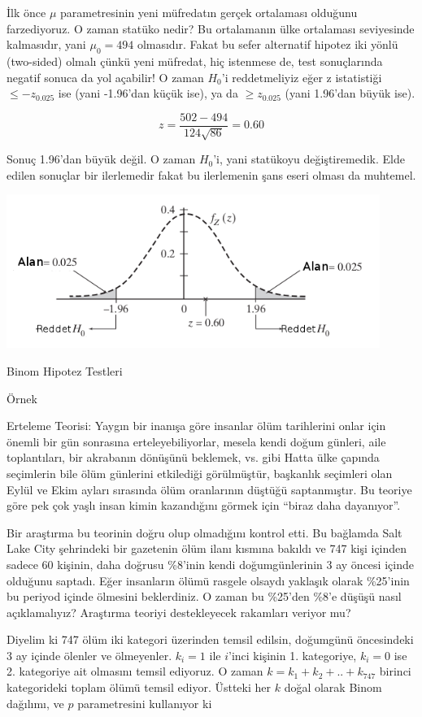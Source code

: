 \documentclass[12pt,fleqn]{article}\usepackage{../../common}
\begin{document}
İlk önce $\mu$ parametresinin yeni müfredatın gerçek ortalaması olduğunu
farzediyoruz. O zaman statüko nedir? Bu ortalamanın ülke ortalaması
seviyesinde kalmasıdır, yani $\mu_0 = 494$ olmasıdır. Fakat bu sefer
alternatif hipotez iki yönlü (two-sided) olmalı çünkü yeni müfredat, hiç
istenmese de, test sonuçlarında negatif sonuca da yol açabilir! O zaman
$H_0$'i reddetmeliyiz eğer z istatistiği $\le -z_{0.025}$ ise (yani
-1.96'dan küçük ise), ya da $\ge z_{0.025}$ (yani 1.96'dan büyük ise). 

$$ z = \frac{502-494}{124\sqrt{86}} = 0.60$$

Sonuç 1.96'dan büyük değil. O zaman $H_0$'i, yani statükoyu
değiştiremedik. Elde edilen sonuçlar bir ilerlemedir fakat bu ilerlemenin şans
eseri olması da muhtemel.

\includegraphics[height=5cm]{sat1.png}

Binom Hipotez Testleri

Örnek

Erteleme Teorisi: Yaygın bir inanışa göre insanlar ölüm tarihlerini onlar
için önemli bir gün sonrasına erteleyebiliyorlar, mesela kendi doğum
günleri, aile toplantıları, bir akrabanın dönüşünü beklemek, vs. gibi Hatta
ülke çapında seçimlerin bile ölüm günlerini etkilediği görülmüştür,
başkanlık seçimleri olan Eylül ve Ekim ayları sırasında ölüm oranlarının
düştüğü saptanmıştır. Bu teoriye göre pek çok yaşlı insan kimin kazandığını
görmek için ``biraz daha dayanıyor''.

Bir araştırma bu teorinin doğru olup olmadığını kontrol etti. Bu bağlamda
Salt Lake City şehrindeki bir gazetenin ölüm ilanı kısmına bakıldı ve 747
kişi içinden sadece 60 kişinin, daha doğrusu \%8'inin kendi doğumgünlerinin
3 ay öncesi içinde olduğunu saptadı. Eğer insanların ölümü rasgele olsaydı
yaklaşık olarak \%25'inin bu periyod içinde ölmesini beklerdiniz. O zaman
bu \%25'den \%8'e düşüşü nasıl açıklamalıyız?  Araştırma teoriyi
destekleyecek rakamları veriyor mu?

Diyelim ki 747 ölüm iki kategori üzerinden temsil edilsin, doğumgünü
öncesindeki 3 ay içinde ölenler ve ölmeyenler. $k_i=1$ ile $i$'inci kişinin
1. kategoriye, $k_i=0$ ise 2. kategoriye ait olmasını temsil ediyoruz. O
zaman $k = k_1 + k_2 + .. + k_{747}$ birinci kategorideki toplam ölümü
temsil ediyor. Üstteki her $k$ doğal olarak Binom dağılımı, ve $p$
parametresini kullanıyor ki 
\end{document}
